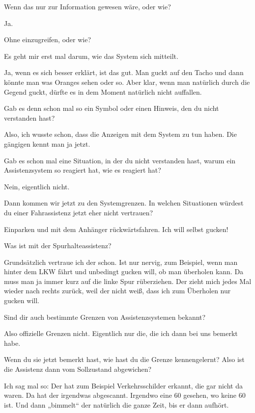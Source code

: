 Wenn das nur zur Information gewesen wäre, oder wie?

\interviewerin
Ja.

Ohne einzugreifen, oder wie?

\interviewerin
Es geht mir erst mal darum, wie das System sich mitteilt.

Ja, wenn es sich besser erklärt, ist das gut. Man guckt auf den Tacho
und dann könnte man was Oranges sehen oder so. Aber klar, wenn man
natürlich durch die Gegend guckt, dürfte es in dem Moment natürlich
nicht auffallen.

\interviewerin
Gab es denn schon mal so ein Symbol oder einen Hinweis, den du nicht
verstanden hast?

Also, ich wusste schon, dass die Anzeigen mit dem System zu tun haben.
Die gängigen kennt man ja jetzt.

\interviewerin
Gab es schon mal eine Situation, in der du nicht verstanden hast, warum
ein Assistenzsystem so reagiert hat, wie es reagiert hat?

Nein, eigentlich nicht.

\interviewerin
Dann kommen wir jetzt zu den Systemgrenzen. In welchen Situationen
würdest du einer Fahrassistenz jetzt eher nicht vertrauen?

Einparken und mit dem Anhänger rückwärtsfahren. Ich will selbst gucken!

\interviewerin
Was ist mit der Spurhalteassistenz?

Grundsätzlich vertraue ich der schon. Ist nur nervig, zum Beispiel, wenn
man hinter dem LKW fährt und unbedingt gucken will, ob man überholen
kann. Da muss man ja immer kurz auf die linke Spur rüberziehen. Der
zieht mich jedes Mal wieder nach rechts zurück, weil der nicht weiß,
dass ich zum Überholen nur gucken will.

\interviewerin
Sind dir auch bestimmte Grenzen von Assistenzsystemen bekannt?

Also offizielle Grenzen nicht. Eigentlich nur die, die ich dann bei uns
bemerkt habe.

\interviewerin
Wenn du sie jetzt bemerkt hast, wie hast du die Grenze kennengelernt?
Also ist die Assistenz dann vom Sollzustand abgewichen?

Ich sag mal so: Der hat zum Beispiel Verkehrsschilder erkannt, die gar
nicht da waren. Da hat der irgendwas abgescannt. Irgendwo eine 60
gesehen, wo keine 60 ist. Und dann „bimmelt“ der natürlich die ganze
Zeit, bis er dann aufhört.

